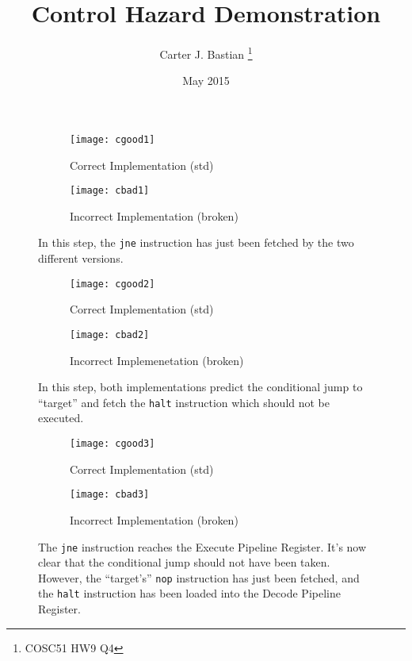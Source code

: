 \documentclass[12pt, letterpaper]{article}
\title{Control Hazard Demonstration}
\author{Carter J. Bastian \thanks{COSC51 HW9 Q4}}
\date{May 2015}
\begin{document}
\maketitle
\begin{figure}[h]
  \begin{subfigure}{0.5\textwidth}
    \texttt{[image: cgood1]}
    \caption{Correct Implementation (std)}
    \label{fig:cgood1}
    \end{subfigure}
  \begin{subfigure}{0.5\textwidth}
    \texttt{[image: cbad1]}
    \caption{Incorrect Implementation (broken)}
    \label{fig:cbad1}
  \end{subfigure}
  \caption{In this step, the \texttt{jne} instruction has just been
            fetched by the two different versions.}
  \label{fig:c1}
\end{figure}
\begin{figure}[h]
  \begin{subfigure}{0.5\textwidth}
    \texttt{[image: cgood2]}
    \caption{Correct Implementation (std)}
    \label{fig:cgood2}
    \end{subfigure}
  \begin{subfigure}{0.5\textwidth}
    \texttt{[image: cbad2]}
    \caption{Incorrect Implemenetation (broken)}
    \label{fig:cbad2}
  \end{subfigure}
  \caption{In this step, both implementations predict the conditional
            jump to ``target'' and fetch the \texttt{halt} instruction
            which should not be executed.}
  \label{fig:c2}
\end{figure}
\begin{figure}[h]
  \begin{subfigure}{0.5\textwidth}
    \texttt{[image: cgood3]}
    \caption{Correct Implementation (std)}
    \label{fig:cgood3}
    \end{subfigure}
  \begin{subfigure}{0.5\textwidth}
    \texttt{[image: cbad3]}
    \caption{Incorrect Implementation (broken)}
    \label{fig:cbad3}
  \end{subfigure}
  \caption
{The \texttt{jne} instruction reaches the Execute Pipeline Register.
It's now clear that the conditional jump should
not have been taken. However, the ``target's'' \texttt{nop} instruction 
has just been fetched, and the \texttt{halt} instruction has been loaded
into the Decode Pipeline Register.}
  \label{fig:c3}
\end{figure}
\end{document}
